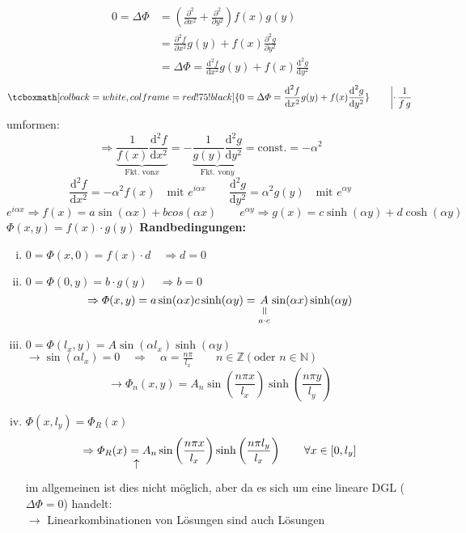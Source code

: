 \documentclass[titlepage,11pt,a4paper,ngerman]{report}
\newcommand{\tx}[1]{\textrm{#1}}
\newcommand{\const}{\tx{const.}}
\newcommand{\ub}[1]{\underbrace{#1}}
\newcommand{\verteq}{\rotatebox{90}{$\,=$}}
\newcommand{\equalto}[2]{\underset{\scriptstyle\overset{\mkern4mu\verteq}{#2}}{#1}}
\newcommand{\custo}[3]{\underset{\scriptstyle\overset{\mkern4mu\rotatebox{-90}{$\,#1$}}{#3}}{#2}}
\newcommand{\prt}[2]{\frac{\partial #1}{\partial #2}}
\newcommand{\prd}[2]{\frac{\tx{d} #1}{\tx{d} #2}}
\renewcommand{\Phi}{\varPhi}
\newcommand{\rmbox}[1]{\tcboxmath[colback=white,colframe=red!75!black]{#1}}
\begin{document}
\begin{align*}
0 = \Delta \Phi &= \left(\prt{^2}{x^2} + \prt{^2}{y^2}\right) f(x) g(y)\\
&= \prt{^2 f}{x^2} g(y) + f(x) \prt{^2 g}{y^2}\\
&= \Delta \Phi = \prd{^2 f}{x^2} g(y) + f(x) \prd{^2 g}{y^2}
\end{align*}
\begin{equation*}
\rmbox{0 = \Delta \Phi = \prd{^2 f}{x^2} g(y) + f(x) \prd{^2 g}{y^2} } \qquad \left\rvert \cdot \, \frac{1}{f\,g} \right.
\end{equation*}
umformen:
\begin{equation*}
\Rightarrow \ub{\frac{1}{f(x)} \prd{^2 f}{x^2}}_{\tx{Fkt. von} x} = - \ub{\frac{1}{g(y)} \prd{^2 g}{y^2}}_{\tx{Fkt. von} y} = \const = - \alpha ^2
\end{equation*}
\begin{equation*}
\prd{^2 f}{x^2} = - \alpha^2 f(x) \quad \tx{mit } e^{i\alpha x} \qquad \prd{^2 g}{y^2} = \alpha^2 g(y) \quad \tx{mit } e^{\alpha y}
\end{equation*}
\begin{equation*}
e^{i \alpha x} \Rightarrow f(x) = a \sin(\alpha x) + b cos(\alpha x) \qquad e^{\alpha y} \Rightarrow g(x) = c \sinh(\alpha y) + d \cosh(\alpha y)
\end{equation*}
$ \Phi(x,y) = f(x) \cdot g(y) $
\textbf{Randbedingungen:}
\begin{enumerate}[i)]
	\item $ 0 = \Phi(x,0) = f(x) \cdot d \quad \Rightarrow d = 0 $
	\item $ 0 = \Phi(0,y) = b \cdot g(y) \quad \Rightarrow b = 0 $
	\begin{equation*}
	\Rightarrow \Phi(x,y) = a \sin(\alpha x) c \sinh(\alpha y) = \equalto{A}{a\cdot c} \sin(\alpha x) \sinh(\alpha y)
	\end{equation*}
	\item $ 0 = \Phi(l_x,y) = A \sin(\alpha l_x) \sinh(\alpha y) $
	$ \rightarrow \sin(\alpha l_x) = 0 \quad \Rightarrow \quad \alpha = \frac{n \pi}{l_x} \qquad n \in \mathbb{Z} (\tx{oder } n \in \mathbb{N}) $
	\begin{equation*}
	\rightarrow \Phi_n(x,y) = A_n \sin\left(\frac{n \pi x}{l_x}\right) \sinh\left(\frac{n \pi y}{l_y}\right)
	\end{equation*}
	\item $ \Phi(x,l_y) = \Phi_R(x) $
	\begin{equation*}
	\Rightarrow \Phi_R(x) \custo{\leftarrow}{=}{} A_n \sin\left(\frac{n \pi x}{l_x}\right) \sinh\left(\frac{n \pi l_y}{l_x}\right) \qquad \forall x \in [0,l_y]
	\end{equation*}
	im allgemeinen ist dies nicht möglich, aber da es sich um eine lineare DGL ($ \Delta \Phi = 0 $) handelt:\\
	$ \rightarrow $ Linearkombinationen von Lösungen sind auch Lösungen
\end{enumerate}
\end{document}
